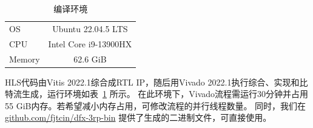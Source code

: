 \begin{table}[htbp]
\caption{编译环境}
\centering
\begin{tabular}{lc}
\toprule
OS & Ubuntu 22.04.5 LTS \\
CPU & Intel Core i9-13900HX \\
Memory & 62.6 GiB \\
\bottomrule
\end{tabular}
\label{tab:env}
\end{table}

HLS代码由Vitis 2022.1综合成RTL IP，随后用Vivado 2022.1执行综合、实现和比特流生成，运行环境如表~\ref{tab:env} 所示。
在此环境下，Vivado流程需运行30分钟并占用55 GiB内存。若希望减小内存占用，可修改流程的并行线程数量。
同时，我们在 \url{github.com/fjtcin/dfx-3rp-bin} 提供了生成的二进制文件，可直接使用。
